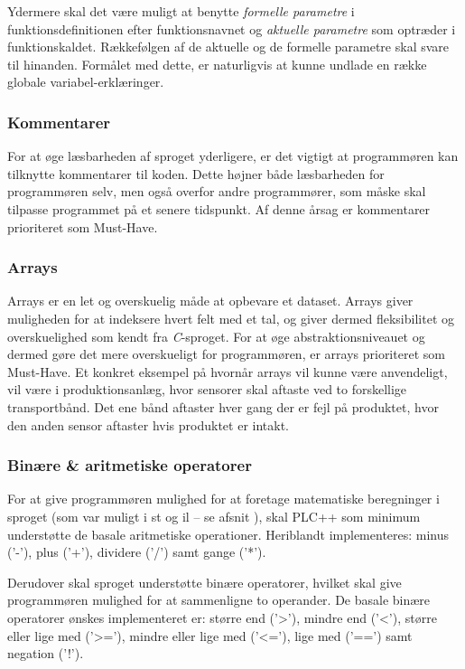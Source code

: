 Ydermere skal det være muligt at benytte \textit{formelle parametre} i funktionsdefinitionen efter funktionsnavnet og \textit{aktuelle parametre} som optræder i funktionskaldet. Rækkefølgen af de aktuelle og de formelle parametre skal svare til hinanden. Formålet med dette, er naturligvis at kunne undlade en række globale variabel-erklæringer. 

\subsubsection{Kommentarer}
For at øge læsbarheden af sproget yderligere, er det vigtigt at programmøren kan tilknytte kommentarer til koden. Dette højner både læsbarheden for programmøren selv, men også overfor andre programmører, som måske skal tilpasse programmet på et senere tidspunkt. Af denne årsag er kommentarer prioriteret som Must-Have. 

\subsubsection{Arrays}
Arrays er en let og overskuelig måde at opbevare et dataset. Arrays giver muligheden for at indeksere hvert felt med et tal, og giver dermed fleksibilitet og overskuelighed som kendt fra \textit{C}-sproget. For at øge abstraktionsniveauet og dermed gøre det mere overskueligt for programmøren, er arrays prioriteret som Must-Have. Et konkret eksempel på hvornår arrays vil kunne være anvendeligt, vil være i produktionsanlæg, hvor sensorer skal aftaste ved to forskellige transportbånd. Det ene bånd aftaster hver gang der er fejl på produktet, hvor den anden sensor aftaster hvis produktet er intakt. 

\subsubsection{Binære \& aritmetiske operatorer} 
For at give programmøren mulighed for at foretage matematiske beregninger i sproget (som var muligt i \gls{st} og {il} – se afsnit ), skal PLC++ som minimum understøtte de basale aritmetiske operationer. Heriblandt implementeres: minus ('-'), plus ('+'), dividere ('/') samt gange ('*').

Derudover skal sproget understøtte binære operatorer, hvilket skal give programmøren mulighed for at sammenligne to operander. De basale binære operatorer ønskes implementeret er: større end ('>'), mindre end ('<'), større eller lige med ('>='), mindre eller lige med ('<='), lige med ('==') samt negation ('!').

